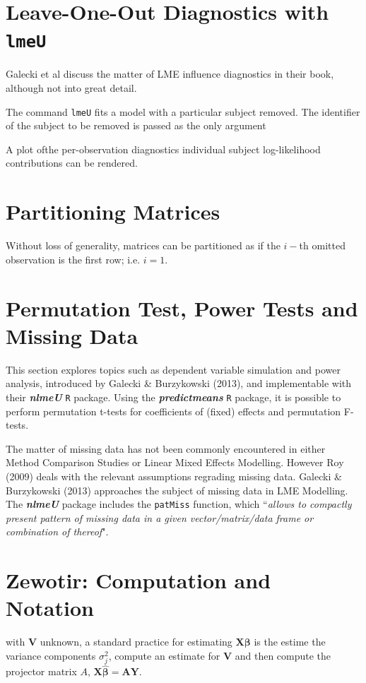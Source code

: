 \documentclass[12pt, a4paper]{report}
\theoremstyle{plain}
\theoremstyle{definition}
\theoremstyle{remark}
\begin{document}
\section{Leave-One-Out Diagnostics with \texttt{lmeU}}
Galecki et al discuss the matter of LME influence diagnostics in their book, although not into great detail.


The command \texttt{lmeU} fits a model with a particular subject removed. The identifier of the subject to be removed is passed as the only argument

A plot ofthe per-observation diagnostics individual subject log-likelihood contributions can be rendered.


\section{Partitioning Matrices} %
Without loss of generality, matrices can be partitioned as if the $i-$th omitted observation is the first row; i.e. $i=1$.


\section{Permutation Test, Power Tests and Missing Data }

This section explores topics such as dependent variable simulation and power analysis, introduced by Galecki \& Burzykowski (2013), and implementable with their \textbf{\textit{nlmeU}} \texttt{R} package.
Using the \textbf{\textit{predictmeans}} \texttt{R} package, it is possible to perform permutation t-tests for coefficients of (fixed) effects and permutation F-tests.

The matter of missing data has not been commonly encountered in either Method Comparison Studies or Linear Mixed Effects Modelling. However Roy (2009) deals with the relevant assumptions regrading missing data. Galecki \& Burzykowski (2013) approaches the subject of missing data in LME Modelling. The \textbf{\textit{nlmeU}} package includes the \texttt{patMiss} function, which ``\textit{allows to compactly present pattern of missing data in a given vector/matrix/data
	frame or combination of thereof}".





	\section{Zewotir: Computation and Notation } %
	with $\boldsymbol{V}$ unknown, a standard practice for estimating $\boldsymbol{X \beta}$ is the estime the variance components $\sigma^2_j$,
	compute an estimate for $\boldsymbol{V}$ and then compute the projector matrix $A$, $\boldsymbol{X \hat{\beta}}  = \boldsymbol{AY}$.
	
\end{document}
